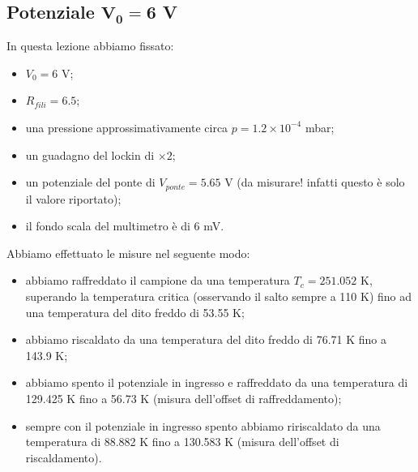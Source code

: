 \documentclass[../main/main.tex]{subfiles}
\begin{document}

\subsection{Potenziale \( \pmb{V_0 = 6} \) V}

In questa lezione abbiamo fissato:
\begin{itemize}
\item \( V_0 = 6 \) V;
\item \( R_{fili} = 6.5 \);
\item una pressione approssimativamente circa \( p=1.2\times10^{-4} \) mbar;
\item un guadagno del lockin di \( \times 2 \);
\item un potenziale del ponte di \( V_{ponte}=5.65 \) V (da misurare! infatti questo è solo il valore riportato);
\item il fondo scala del multimetro è di \( 6 \) mV.
\end{itemize}

Abbiamo effettuato le misure nel seguente modo:
\begin{itemize}
\item abbiamo raffreddato il campione da una temperatura \( T_c= 251.052\) K, superando la temperatura critica (osservando il salto sempre a 110 K) fino ad una temperatura del dito freddo di 53.55 K;
\item abbiamo riscaldato da una temperatura del dito freddo di 76.71 K fino a 143.9 K;
\item abbiamo spento il potenziale in ingresso e raffreddato da una temperatura di 129.425 K fino a 56.73 K (misura dell'offset di raffreddamento);
\item sempre con il potenziale in ingresso spento abbiamo ririscaldato da una temperatura di 88.882 K fino a 130.583 K (misura dell'offset di riscaldamento).
\end{itemize}
\end{document}
